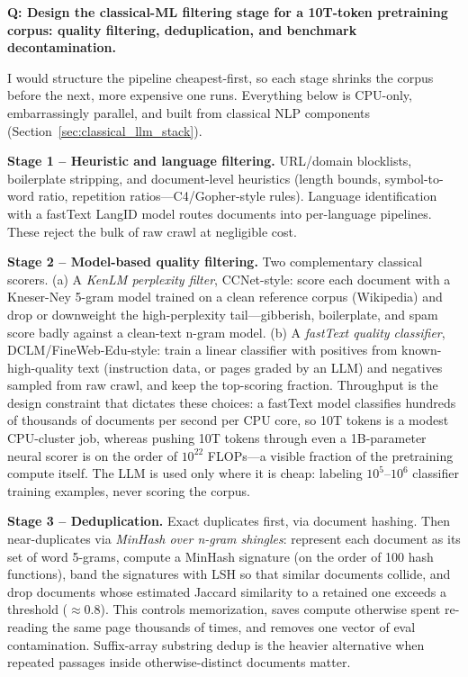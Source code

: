 \begin{interviewq}
\textbf{Q: Design the classical-ML filtering stage for a 10T-token pretraining corpus:
quality filtering, deduplication, and benchmark decontamination.}

 \quad {} \quad \badgefreq{\freqmed}

\stronganswer
I would structure the pipeline cheapest-first, so each stage shrinks the corpus before
the next, more expensive one runs. Everything below is CPU-only, embarrassingly
parallel, and built from classical NLP components (Section~\ref{sec:classical_llm_stack}).

\textbf{Stage 1 -- Heuristic and language filtering.} URL/domain blocklists,
boilerplate stripping, and document-level heuristics (length bounds, symbol-to-word
ratio, repetition ratios---C4/Gopher-style rules). Language identification with a
fastText LangID model routes documents into per-language pipelines. These reject the
bulk of raw crawl at negligible cost.

\textbf{Stage 2 -- Model-based quality filtering.} Two complementary classical
scorers. (a) A \emph{KenLM perplexity filter}, CCNet-style: score each document with a
Kneser-Ney 5-gram model trained on a clean reference corpus (Wikipedia) and drop or
downweight the high-perplexity tail---gibberish, boilerplate, and spam score badly
against a clean-text n-gram model. (b) A \emph{fastText quality classifier},
DCLM/FineWeb-Edu-style: train a linear classifier with positives from
known-high-quality text (instruction data, or pages graded by an LLM) and negatives
sampled from raw crawl, and keep the top-scoring fraction. Throughput is the design
constraint that dictates these choices: a fastText model classifies hundreds of
thousands of documents per second per CPU core, so 10T tokens is a modest CPU-cluster
job, whereas pushing 10T tokens through even a 1B-parameter neural scorer is on the
order of $10^{22}$ FLOPs---a visible fraction of the pretraining compute itself. The
LLM is used only where it is cheap: labeling $10^5$--$10^6$ classifier training
examples, never scoring the corpus.

\textbf{Stage 3 -- Deduplication.} Exact duplicates first, via document hashing. Then
near-duplicates via \emph{MinHash over n-gram shingles}: represent each document as its
set of word 5-grams, compute a MinHash signature (on the order of 100 hash functions),
band the signatures with LSH so that similar documents collide, and drop documents
whose estimated Jaccard similarity to a retained one exceeds a threshold
($\approx 0.8$). This controls memorization, saves compute otherwise spent re-reading
the same page thousands of times, and removes one vector of eval contamination.
Suffix-array substring dedup is the heavier alternative when repeated passages inside
otherwise-distinct documents matter.


\end{interviewq}
